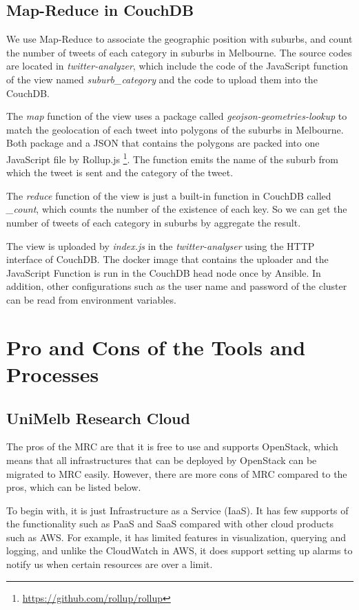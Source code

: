 \documentclass[parskip=full, 11pt]{article}
\begin{document}
\subsection{Map-Reduce in CouchDB}

We use Map-Reduce to associate the geographic position with suburbs, and count the number of tweets of each category in suburbs in Melbourne. The source codes are located in \emph{twitter-analyzer}, which include the code of the JavaScript function of the view named \emph{suburb\_category} and the code to upload them into the CouchDB.

The \emph{map} function of the view uses a package called \emph{geojson-geometries-lookup} to match the geolocation of each tweet into polygons of the suburbs in Melbourne. Both package and a JSON that contains the polygons are packed into one JavaScript file by Rollup.js \footnote{\url{https://github.com/rollup/rollup}}. The function emits the name of the suburb from which the tweet is sent and the category of the tweet.

The \emph{reduce} function of the view is just a built-in function in CouchDB called \emph{\_count}, which counts the number of the existence of each key. So we can get the number of tweets of each category in suburbs by aggregate the result.

The view is uploaded by \emph{index.js} in the \emph{twitter-analyser} using the HTTP interface of CouchDB. The docker image that contains the uploader and the JavaScript Function is run in the CouchDB head node once by Ansible. In addition, other configurations such as the user name and password of the cluster can be read from environment variables.

\section{Pro and Cons of the Tools and Processes}

\subsection{UniMelb Research Cloud}
\label{sec:UniMelb Research Cloud}

The pros of the MRC are that it is free to use and supports OpenStack, which means that all infrastructures that can be deployed by OpenStack can be migrated to MRC easily. However, there are more cons of MRC compared to the pros, which can be listed below.

To begin with, it is just Infrastructure as a Service (IaaS). It has few supports of the functionality such as PaaS and SaaS compared with other cloud products such as AWS. For example, it has limited features in visualization, querying and logging, and unlike the CloudWatch in AWS, it does support setting up alarms to notify us when certain resources are over a limit.
\end{document}
